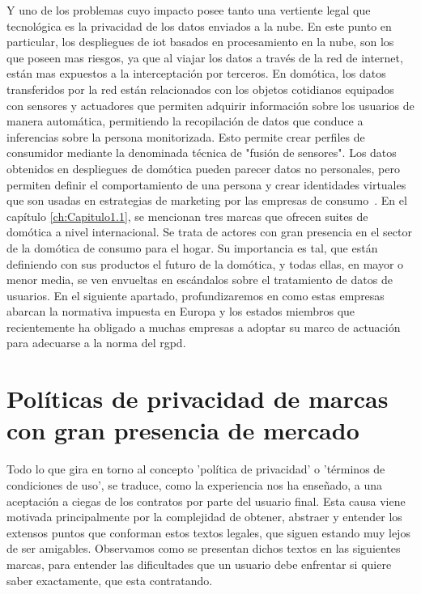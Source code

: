 \vspace{1cm}

Y uno de los problemas cuyo impacto posee tanto una vertiente legal que tecnológica es la privacidad de los datos enviados a la nube. En este punto en particular, los despliegues de \gls{iot} basados en procesamiento en la nube, son los que poseen mas riesgos, ya que al viajar los datos a través de la red de internet, están mas expuestos a la interceptación por terceros. En domótica, los datos transferidos por la red están relacionados con los  objetos cotidianos equipados con sensores y actuadores que permiten adquirir información sobre los usuarios de manera automática, permitiendo la recopilación de datos que conduce a inferencias sobre la persona monitorizada. Esto permite crear perfiles de consumidor mediante la denominada técnica de "fusión de sensores". Los datos obtenidos en despliegues de domótica pueden parecer datos no personales, pero permiten definir el comportamiento de una persona y crear identidades virtuales que son usadas en estrategias de marketing por las empresas de consumo~\cite{iotDataProtection}. En el capítulo \ref{ch:Capitulo1.1}, se mencionan tres marcas que ofrecen suites de domótica a nivel internacional. Se trata de actores con gran presencia en el sector de la domótica de consumo para el hogar. Su importancia es tal, que están definiendo con sus productos el futuro de la domótica, y todas ellas, en mayor o menor media, se ven envueltas en escándalos sobre el tratamiento de datos de usuarios. En el siguiente apartado, profundizaremos en como estas empresas abarcan la normativa impuesta en Europa y los estados miembros que recientemente ha obligado a muchas empresas a adoptar su marco de actuación para adecuarse a la norma del \gls{rgpd}.

\section{Políticas de privacidad de marcas con gran presencia de mercado}
\label{ch:Capitulo2.1}

Todo lo que gira en torno al concepto 'política de privacidad' o 'términos de condiciones de uso', se traduce, como la experiencia nos ha enseñado, a una aceptación a ciegas de los contratos por parte del usuario final. Esta causa viene motivada principalmente por la complejidad de obtener, abstraer y entender los extensos puntos que conforman estos textos legales, que siguen estando muy lejos de ser amigables. Observamos como se presentan dichos textos en las siguientes marcas, para entender las dificultades que un usuario debe enfrentar si quiere saber exactamente, que esta contratando.

